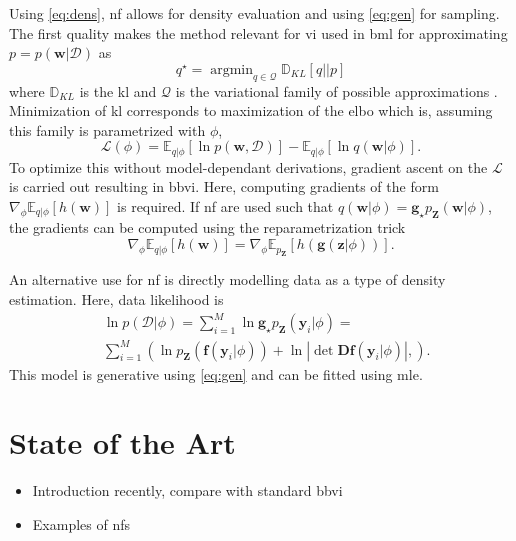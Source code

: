 \documentclass[12pt,fleqn,twocolumn]{article}
\newcommand{\ginv}{\mathbf f}
\newcommand{\push}{\mathbf g_\star p_\mathbf Z}
\begin{document}
Using \eqref{eq:dens}, \acrshort{nf} allows for density evaluation and using \eqref{eq:gen} for sampling.
The first quality makes the method relevant for \acrfull{vi} used in \acrshort{bml} for approximating $p=p(\mathbf w | \mathcal D)$ as 
\begin{equation}
    q^\star = \operatorname{argmin}_{q\in \mathcal Q} \mathbb D_{KL}[q || p] 
\end{equation}
where $\mathbb D_{KL}$ is the \acrfull{kl} and $\mathcal Q$ is the variational family of possible approximations \cite{Blei2016VariationalIA}.
Minimization of \acrshort{kl} corresponds to maximization of the \acrfull{elbo} which is, assuming this family is parametrized with $\phi$,
\begin{equation}
    \mathcal L(\phi) = \mathbb E_{q|\phi}[\ln p(\mathbf w, \mathcal D)] - \mathbb E_{q|\phi}[\ln q(\mathbf w|\phi)].
\end{equation}
To optimize this without model-dependant derivations, gradient ascent on the $\mathcal L$ is carried out resulting in \acrfull{bbvi}.
Here, computing gradients of the form $ \nabla_\phi \mathbb E_{q|\phi}[h(\mathbf w)]$ is required.
If \acrshort{nf} are used such that $q(\mathbf w|\phi)=\push(\mathbf w| \phi)$, the gradients can be computed using the reparametrization trick \cite{JimenezRezende2015VariationalIW}
\begin{equation}
    \nabla_\phi \mathbb E_{q|\phi}[h(\mathbf w)]
    =
    \nabla_\phi \mathbb E_{p_\mathbf Z}[h(\mathbf g(\mathbf z | \phi))].
\end{equation}

An alternative use for \acrshort{nf} is directly modelling data as a type of density estimation.
Here, data likelihood is
\begin{align*}
    & \ln p (\mathcal D| \phi)  = \sum_{i=1}^M \ln \push(\mathbf y_i|\phi) = \\
    & \sum_{i=1}^M \left(
        \ln p_\mathbf Z(\ginv(\mathbf y_i|\phi)) + \ln \left| \det \mathbf D\ginv(\mathbf y_i|\phi)\right|,
    \right).
\end{align*}
This model is generative using \eqref{eq:gen} and can be fitted using \acrfull{mle}.

\section*{State of the Art}%
\begin{itemize}
    \item Introduction recently, compare with standard bbvi
    \item Examples of nfs
\end{itemize}
\end{document}
